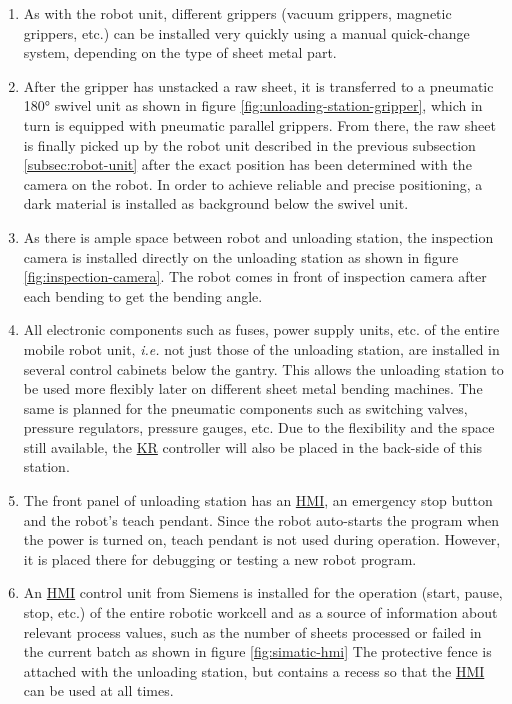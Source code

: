 \begin{enumerate}
    \item As with the robot unit, different grippers (vacuum grippers, magnetic grippers, etc.) can be
    installed very quickly using a manual quick-change system, depending on the type of sheet metal part.
    \item After the gripper has unstacked a raw sheet, it is transferred to a pneumatic 180° swivel unit as shown in figure \ref{fig:unloading-station-gripper}, which in
    turn is equipped with pneumatic parallel grippers. From
    there, the raw sheet is finally picked up by the robot unit described in the previous subsection \ref{subsec:robot-unit} after the
    exact position has been determined with the camera on the robot. In order to achieve reliable and
    precise positioning, a dark material is installed as background below the swivel unit. 
    \item As there is ample space between robot and unloading station, the inspection camera is installed directly on the unloading station as shown in figure \ref{fig:inspection-camera}.
    The robot comes in front of inspection camera after each bending to get the bending angle.
    \item All electronic
    components such as fuses, power supply units, etc. of the entire mobile robot unit, \textit{i.e.} not just those of
    the unloading station, are installed in several control cabinets below the gantry. This allows the
    unloading station to be used more flexibly later on different sheet metal bending machines. The same is
    planned for the pneumatic components such as switching valves, pressure regulators, pressure
    gauges, etc. Due to the flexibility and the space still available, the \hyperref[acro:KR]{KR} controller will also be
    placed in the back-side of this station.
    \item The front panel of unloading station has an \hyperref[acro:HMI]{HMI}, an emergency stop button and the robot's teach pendant. Since the robot auto-starts the program
    when the power is turned on, teach pendant is not used during operation. However, it is placed there for debugging or testing a new robot program.


    \item An \hyperref[acro:HMI]{HMI} control unit from Siemens is installed for the operation (start, pause, stop, etc.) of the entire robotic workcell and as
    a source of information about relevant process values, such as the number of sheets processed or failed in the current batch as shown in figure \ref{fig:simatic-hmi} The protective fence is attached with the unloading station, but contains a recess so that the \hyperref[acro:HMI]{HMI} can be used at all times.
\end{enumerate}
